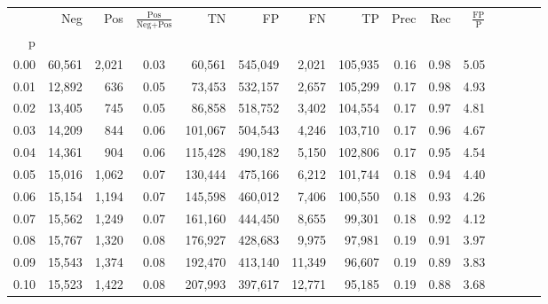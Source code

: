 \begin{tabular}{rrrcrrrrrrrrrrr}
\toprule
{} &     Neg &     Pos & $\frac{\text{Pos}}{\text{Neg}+\text{Pos}}$ &       TN &       FP &       FN &       TP &  Prec &   Rec & $\frac{\text{FP}}{\text{P}}$ \\
p    &         &         &                                            &          &          &          &          &       &       &                              \\
\midrule
0.00 &  60,561 &   2,021 &                                       0.03 &   60,561 &  545,049 &    2,021 &  105,935 &  0.16 &  0.98 &                         5.05 \\
0.01 &  12,892 &     636 &                                       0.05 &   73,453 &  532,157 &    2,657 &  105,299 &  0.17 &  0.98 &                         4.93 \\
0.02 &  13,405 &     745 &                                       0.05 &   86,858 &  518,752 &    3,402 &  104,554 &  0.17 &  0.97 &                         4.81 \\
0.03 &  14,209 &     844 &                                       0.06 &  101,067 &  504,543 &    4,246 &  103,710 &  0.17 &  0.96 &                         4.67 \\
0.04 &  14,361 &     904 &                                       0.06 &  115,428 &  490,182 &    5,150 &  102,806 &  0.17 &  0.95 &                         4.54 \\
0.05 &  15,016 &   1,062 &                                       0.07 &  130,444 &  475,166 &    6,212 &  101,744 &  0.18 &  0.94 &                         4.40 \\
0.06 &  15,154 &   1,194 &                                       0.07 &  145,598 &  460,012 &    7,406 &  100,550 &  0.18 &  0.93 &                         4.26 \\
0.07 &  15,562 &   1,249 &                                       0.07 &  161,160 &  444,450 &    8,655 &   99,301 &  0.18 &  0.92 &                         4.12 \\
0.08 &  15,767 &   1,320 &                                       0.08 &  176,927 &  428,683 &    9,975 &   97,981 &  0.19 &  0.91 &                         3.97 \\
0.09 &  15,543 &   1,374 &                                       0.08 &  192,470 &  413,140 &   11,349 &   96,607 &  0.19 &  0.89 &                         3.83 \\
0.10 &  15,523 &   1,422 &                                       0.08 &  207,993 &  397,617 &   12,771 &   95,185 &  0.19 &  0.88 &                         3.68 \\

\end{tabular}

